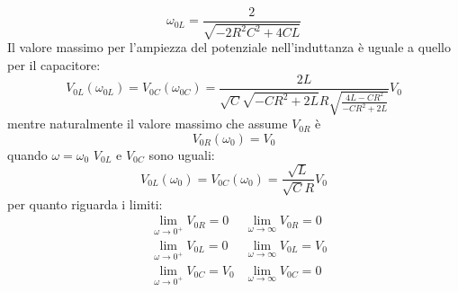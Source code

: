 \begin{equation}
  \omega_{0L}=\frac{2}{\sqrt{-2R^2C^2+4CL}}
\end{equation}
Il valore massimo per l'ampiezza del potenziale nell'induttanza è uguale a quello per il capacitore:
\begin{equation}
  V_{0L}(\omega_{0L})=V_{0C}(\omega_{0C})=\frac{2L}{\sqrt{C}\sqrt{-CR^2+2L}R\sqrt{\frac{4L-CR^2}{-CR^2+2L}}}V_0
\end{equation}
mentre naturalmente il valore massimo che assume $V_{0R}$ è
\begin{equation}
  V_{0R}(\omega_0)=V_0
\end{equation}
quando $\omega=\omega_0$ $V_{0L}$ e $V_{0C}$ sono uguali:
\begin{equation}
  V_{0L}(\omega_0)=V_{0C}(\omega_0)=\frac{\sqrt{L}}{\sqrt{C}R}V_0
\end{equation}
per quanto riguarda i limiti:
\begin{subequations}
  \begin{align}
     & \lim_{\omega\to 0^+}V_{0R}=0   & \lim_{\omega\to \infty}V_{0R}=0   \\
     & \lim_{\omega\to 0^+}V_{0L}=0   & \lim_{\omega\to \infty}V_{0L}=V_0 \\
     & \lim_{\omega\to 0^+}V_{0C}=V_0 & \lim_{\omega\to \infty}V_{0C}=0
  \end{align}
\end{subequations}

